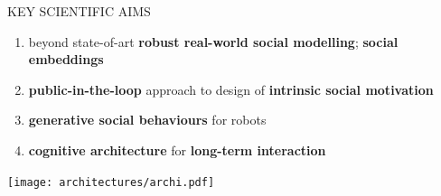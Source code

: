 \documentclass[xcolor=table]{beamer}
\begin{document}
\begin{frame}{KEY SCIENTIFIC AIMS}

    \begin{enumerate}
        \scriptsize
        \item beyond state-of-art \textbf{robust real-world social modelling}; \textbf{social embeddings}
        \item \textbf{public-in-the-loop} approach to design of \textbf{intrinsic social motivation}
        \item \textbf{generative social behaviours} for robots
        \item \textbf{cognitive architecture} for \textbf{long-term interaction}
    \end{enumerate}

    \begin{center}
        \texttt{[image: architectures/archi.pdf]}
    \end{center}
\end{frame}
\end{document}
